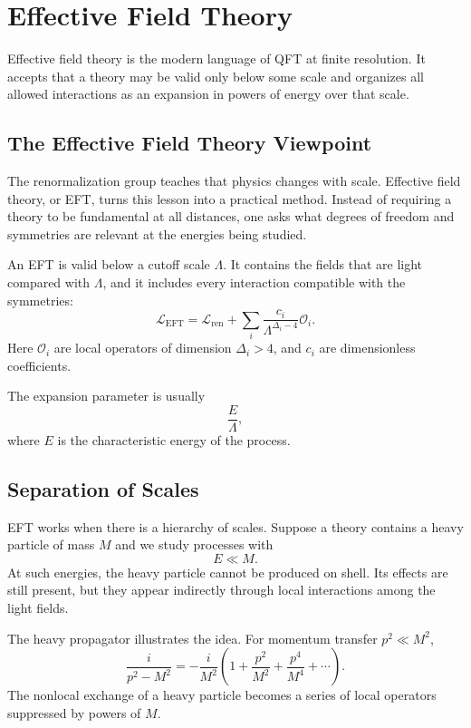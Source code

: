 \chapter{Effective Field Theory}

\begin{remarkbox}
Effective field theory is the modern language of QFT at finite resolution. It
accepts that a theory may be valid only below some scale and organizes all
allowed interactions as an expansion in powers of energy over that scale.
\end{remarkbox}

\section{The Effective Field Theory Viewpoint}

The renormalization group teaches that physics changes with scale. Effective
field theory, or EFT, turns this lesson into a practical method. Instead of
requiring a theory to be fundamental at all distances, one asks what degrees of
freedom and symmetries are relevant at the energies being studied.

An EFT is valid below a cutoff scale \(\Lambda\). It contains the fields that are
light compared with \(\Lambda\), and it includes every interaction compatible
with the symmetries:
\[
    \mathcal{L}_{\mathrm{EFT}}
    = \mathcal{L}_{\mathrm{ren}}
      +\sum_i \frac{c_i}{\Lambda^{\Delta_i-4}}\mathcal{O}_i.
\]
Here \(\mathcal{O}_i\) are local operators of dimension \(\Delta_i>4\), and
\(c_i\) are dimensionless coefficients.

The expansion parameter is usually
\[
    \frac{E}{\Lambda},
\]
where \(E\) is the characteristic energy of the process.

\section{Separation of Scales}

EFT works when there is a hierarchy of scales. Suppose a theory contains a heavy
particle of mass \(M\) and we study processes with
\[
    E\ll M.
\]
At such energies, the heavy particle cannot be produced on shell. Its effects
are still present, but they appear indirectly through local interactions among
the light fields.

The heavy propagator illustrates the idea. For momentum transfer \(p^2\ll M^2\),
\[
    \frac{i}{p^2-M^2}
    = -\frac{i}{M^2}\left(1+\frac{p^2}{M^2}+\frac{p^4}{M^4}+\cdots\right).
\]
The nonlocal exchange of a heavy particle becomes a series of local operators
suppressed by powers of \(M\).

